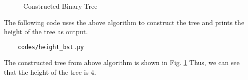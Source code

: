 \documentclass[journal,12pt,twocolumn]{IEEEtran}
\begin{document}
\begin{figure}[!ht]
\centering

\caption{Constructed Binary Tree}
\label{fig:bst}
\end{figure}
The following code uses the above algorithm to construct the tree and prints the height of the tree as output. 
\begin{lstlisting}
    codes/height_bst.py
\end{lstlisting}
The constructed tree from above algorithm is shown in Fig. \ref{fig:bst}
\newline
Thus, we can see that the height of the tree is 4.
\end{document}
